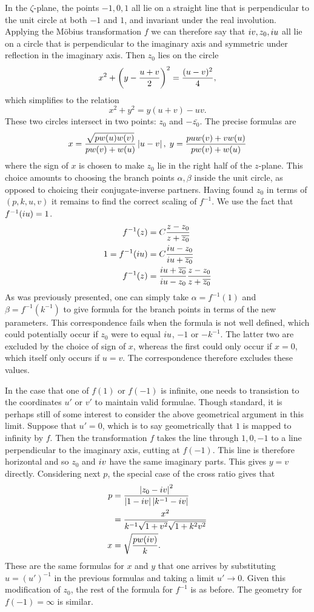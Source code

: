 In the $ζ$-plane, the points $-1,0,1$ all lie on a straight line that is perpendicular to the unit circle at both $-1$ and $1$, and invariant under the real involution. Applying the M\"obius transformation $f$ we can therefore say that $i v, z_0, i u$ all lie on a circle that is perpendicular to the imaginary axis and symmetric under reflection in the imaginary axis. Then $z_0$ lies on the circle
\[
x^2 + \left( y - \frac{u+v}{2} \right)^2 = \frac{(u-v)^2}{4},
\]
which simplifies to the relation
\[
x^2 + y^2 = y(u+v) - uv.
\]
These two circles intersect in two points: $z_0$ and $-\bar{z_0}$. The precise formulas are
\[
x = \frac{\sqrt{pw(u)w(v)}}{pw(v) + w(u)} \left|u-v\right|,\; y = \frac{puw(v) + vw(u)}{pw(v) + w(u)}
\]
where the sign of $x$ is chosen to make $z_0$ lie in the right half of the $z$-plane. This choice amounts to choosing the branch points $α,β$ inside the unit circle, as opposed to choicing their conjugate-inverse partners. Having found $z_0$ in terms of $(p,k,u,v)$ it remains to find the correct scaling of $f^{-1}$. We use the fact that $f^{-1}(i u) = 1$.
\begin{align*}
f^{-1}(z) &= C \frac{z-z_0}{z + \overline{z_0}} \\
1 = f^{-1}(i u) &= C \frac{i u - z_0}{i u + \overline{z_0}} \\
f^{-1}(z) &=  \frac{i u + \overline{z_0}}{i u - z_0} \frac{z-z_0}{z + \overline{z_0}}
\end{align*}
As was previously presented, one can simply take $α = f^{-1}(1)$ and $β = f^{-1}(k^{-1})$ to give formula for the branch points in terms of the new parameters. This correspondence fails when the formula is not well defined, which could potentially occur if $z_0$ were to equal $i u$, $-1$ or $-k^{-1}$. The latter two are excluded by the choice of sign of $x$, whereas the first could only occur if $x=0$, which itself only occurs if $u=v$. The correspondence therefore excludes these values.

In the case that one of $f(1)$ or $f(-1)$ is infinite, one needs to transistion to the coordinates $u'$ or $v'$ to maintain valid formulae. Though standard, it is perhaps still of some interest to consider the above geometrical argument in this limit. Suppose that $u' = 0$, which is to say geometrically that $1$ is mapped to infinity by $f$. Then the transformation $f$ takes the line through $1,0,-1$ to a line perpendicular to the imaginary axis, cutting at $f(-1)$. This line is therefore horizontal and so $z_0$ and $i v$ have the same imaginary parts. This gives $y=v$ directly. Considering next $p$, the special case of the cross ratio gives that
\begin{align}
p
&= \frac{\left|z_0 -i v\right|^2}{\left|1-i v\right|\left|k^{-1}-i v\right|} \\
&= \frac{x^2}{k^{-1}\sqrt{1+v^2}\sqrt{1+k^2 v^2}} \\
x &= \sqrt{\frac{p w(i v)}{k}}.
\end{align}
These are the same formulas for $x$ and $y$ that one arrives by substituting $u = (u')^{-1}$ in the previous formulas and taking a limit $u' \to 0$. Given this modification of $z_0$, the rest of the formula for $f^{-1}$ is as before. The geometry for $f(-1) = \infty$ is similar.

